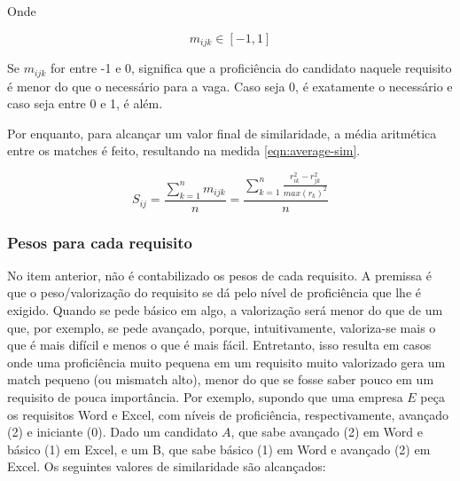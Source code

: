 \documentclass[preprint,12pt]{elsarticle}
\begin{document}
Onde

\begin{equation}
m_{ijk} \in [-1, 1]
\end{equation}

Se $m_{ijk}$ for entre -1 e 0, significa que a proficiência do candidato naquele requisito é menor do que o necessário para a vaga. Caso seja 0, é exatamente o necessário e caso seja entre 0 e 1, é além.

Por enquanto, para alcançar um valor final de similaridade, a média aritmética entre os matches é feito, resultando na medida \ref{eqn:average-sim}.

\begin{equation}
\label{eqn:average-sim}
S_{ij} =  \frac{\sum_{k=1}^n m_{ijk}}
              {n} = 
          \frac{\sum_{k=1}^n \frac{r_{ik}^2 - r_{jk}^2}{max(r_k)^2}}
              {n}
\end{equation}

\subsubsection{Pesos para cada requisito}
\label{sssec:weights}


   
No item anterior, não é contabilizado os pesos de cada requisito. A premissa é que o peso/valorização do requisito se dá pelo nível de proficiência que lhe é exigido. Quando se pede básico em algo, a valorização será menor do que de um que, por exemplo, se pede avançado, porque, intuitivamente, valoriza-se mais o que é mais difícil e menos o que é mais fácil. Entretanto, isso resulta em casos onde uma proficiência muito pequena em um requisito muito valorizado gera um match pequeno (ou mismatch alto), menor do que se fosse saber pouco em um requisito de pouca importância. Por exemplo, supondo que uma empresa $E$ peça os requisitos Word e Excel, com níveis de proficiência, respectivamente, avançado (2) e iniciante (0). Dado um candidato $A$, que sabe avançado (2) em Word e básico (1) em Excel, e um B, que sabe básico (1) em Word e avançado (2) em Excel. Os seguintes valores de similaridade são alcançados:
\end{document}
